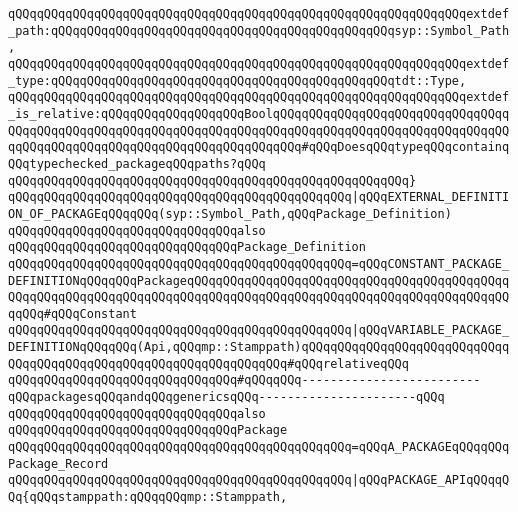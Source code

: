 \verb|qQQqqQQqqQQqqQQqqQQqqQQqqQQqqQQqqQQqqQQqqQQqqQQqqQQqqQQqqQQqqQQqextdef_path:qQQqqQQqqQQqqQQqqQQqqQQqqQQqqQQqqQQqqQQqqQQqqQQqsyp::Symbol_Path,|\newline
\verb|qQQqqQQqqQQqqQQqqQQqqQQqqQQqqQQqqQQqqQQqqQQqqQQqqQQqqQQqqQQqqQQqextdef_type:qQQqqQQqqQQqqQQqqQQqqQQqqQQqqQQqqQQqqQQqqQQqqQQqtdt::Type,|\newline
\verb|qQQqqQQqqQQqqQQqqQQqqQQqqQQqqQQqqQQqqQQqqQQqqQQqqQQqqQQqqQQqqQQqextdef_is_relative:qQQqqQQqqQQqqQQqqQQqBoolqQQqqQQqqQQqqQQqqQQqqQQqqQQqqQQqqQQqqQQqqQQqqQQqqQQqqQQqqQQqqQQqqQQqqQQqqQQqqQQqqQQqqQQqqQQqqQQqqQQqqQQqqQQqqQQqqQQqqQQqqQQqqQQqqQQqqQQqqQQqqQQq#qQQqDoesqQQqtypeqQQqcontainqQQqtypechecked_packageqQQqpaths?qQQq|\newline
\verb|qQQqqQQqqQQqqQQqqQQqqQQqqQQqqQQqqQQqqQQqqQQqqQQqqQQqqQQq}|\newline
\newline
\verb|qQQqqQQqqQQqqQQqqQQqqQQqqQQqqQQqqQQqqQQqqQQqqQQq|\verb#|qQQqEXTERNAL_DEFINITION_OF_PACKAGEqQQqqQQq(syp::Symbol_Path,qQQqPackage_Definition)#\newline
\newline
\verb|qQQqqQQqqQQqqQQqqQQqqQQqqQQqqQQqalso|\newline
\verb|qQQqqQQqqQQqqQQqqQQqqQQqqQQqqQQqPackage_Definition|\newline
\verb|qQQqqQQqqQQqqQQqqQQqqQQqqQQqqQQqqQQqqQQqqQQqqQQq=qQQqCONSTANT_PACKAGE_DEFINITIONqQQqqQQqPackageqQQqqQQqqQQqqQQqqQQqqQQqqQQqqQQqqQQqqQQqqQQqqQQqqQQqqQQqqQQqqQQqqQQqqQQqqQQqqQQqqQQqqQQqqQQqqQQqqQQqqQQqqQQqqQQqqQQqqQQq#qQQqConstant|\newline
\verb|qQQqqQQqqQQqqQQqqQQqqQQqqQQqqQQqqQQqqQQqqQQqqQQq|\verb#|qQQqVARIABLE_PACKAGE_DEFINITIONqQQqqQQq(Api,qQQqmp::Stamppath)qQQqqQQqqQQqqQQqqQQqqQQqqQQqqQQqqQQqqQQqqQQqqQQqqQQqqQQqqQQqqQQqqQQq#\verb|#qQQqrelativeqQQq|\newline
\newline
\verb|qQQqqQQqqQQqqQQqqQQqqQQqqQQqqQQq#qQQqqQQq-------------------------qQQqpackagesqQQqandqQQqgenericsqQQq----------------------qQQq|\newline
\newline
\verb|qQQqqQQqqQQqqQQqqQQqqQQqqQQqqQQqalso|\newline
\verb|qQQqqQQqqQQqqQQqqQQqqQQqqQQqqQQqPackage|\newline
\verb|qQQqqQQqqQQqqQQqqQQqqQQqqQQqqQQqqQQqqQQqqQQqqQQq=qQQqA_PACKAGEqQQqqQQqPackage_Record|\newline
\verb|qQQqqQQqqQQqqQQqqQQqqQQqqQQqqQQqqQQqqQQqqQQqqQQq|\verb#|qQQqPACKAGE_APIqQQqqQQq{qQQqstamppath:qQQqqQQqmp::Stamppath,#\newline
